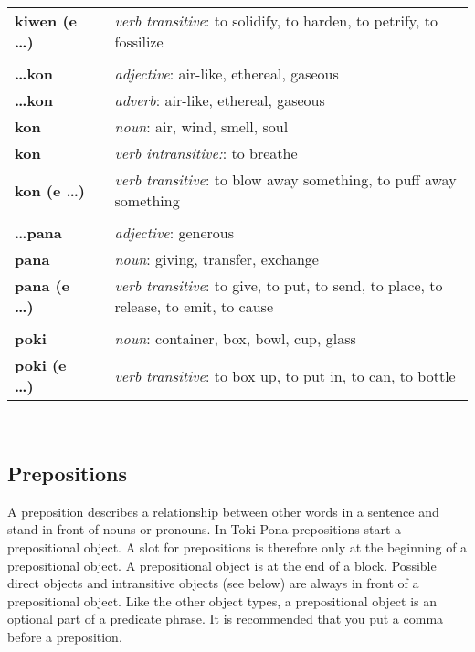 \begin{supertabular}{p{2,5cm}|ll}
\textbf{kiwen (e \dots)} && \textit{verb transitive}: to solidify, to harden, to petrify, to fossilize \\ %
 && \\ %
\textbf{\dots kon} && \textit{adjective}: air-like, ethereal, gaseous \\ %
\textbf{\dots kon} && \textit{adverb}: air-like, ethereal, gaseous \\ %
\textbf{kon} && \textit{noun}: air, wind, smell, soul \\ %
\textbf{kon} && \textit{verb intransitive:}: to breathe \\ %
\textbf{kon (e \dots)} && \textit{verb transitive}: to blow away something, to puff away something \\ %
 && \\ %
\textbf{\dots pana} && \textit{adjective}: generous \\ %
\textbf{pana} && \textit{noun}: giving, transfer, exchange \\ %
\textbf{pana (e \dots)} && \textit{verb transitive}: to give, to put, to send, to place, to release, to emit, to cause \\ %
 && \\ %
\textbf{poki} && \textit{noun}: container, box, bowl, cup, glass \\ %
\textbf{poki (e \dots)} && \textit{verb transitive}: to box up, to put in, to can, to bottle \\ %
\end{supertabular} \\
%
\subsection*{Prepositions}
%
A preposition describes a relationship between other words in a sentence and stand in front of nouns or pronouns. 
In Toki Pona prepositions start a prepositional object. 
A slot for prepositions is therefore only at the beginning of a prepositional object. 
A prepositional object is at the end of a block. 
Possible direct objects and intransitive objects (see below) are always in front of a prepositional object.
Like the other object types, a prepositional object is an optional part of a predicate phrase. 
It is recommended that you put a comma before a preposition.
%
